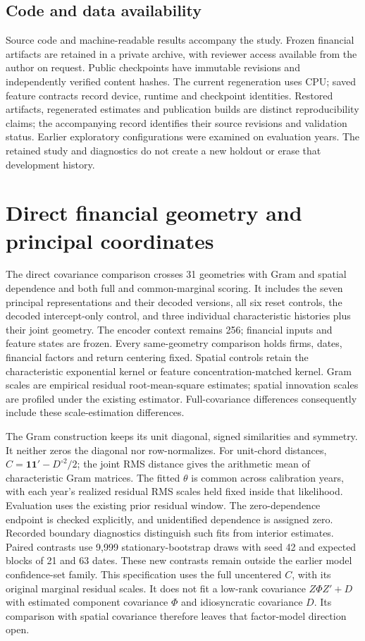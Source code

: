\documentclass[11pt]{article}
\begin{document}
\subsection{Code and data availability}
Source code and machine-readable results accompany the study. Frozen financial
artifacts are retained in a private archive, with reviewer access available
from the author on request. Public checkpoints have immutable revisions and
independently verified content hashes. The current regeneration uses
CPU\@; saved
feature contracts record device, runtime and checkpoint identities.
Restored artifacts, regenerated estimates
and publication builds are distinct reproducibility claims; the accompanying
record identifies their source revisions and validation status. Earlier
exploratory configurations were examined on evaluation years. The retained
study and diagnostics do not create a new holdout or erase that development
history.

\section{Direct financial geometry and principal
coordinates}\label{sec:geometry}
The direct covariance comparison crosses 31 geometries with Gram and spatial
dependence and both full and common-marginal scoring. It includes the seven
principal representations and their decoded versions, all six reset controls,
the decoded intercept-only control, and three individual characteristic
histories plus their joint geometry. The encoder context remains 256; financial
inputs and feature states are frozen. Every same-geometry comparison holds
firms, dates, financial factors and return centering fixed. Spatial controls
retain the characteristic exponential kernel or feature concentration-matched
kernel. Gram scales are empirical residual root-mean-square estimates; spatial
innovation scales are profiled under the existing estimator. Full-covariance
differences consequently include these scale-estimation differences.

The Gram construction keeps its unit diagonal, signed similarities and symmetry.
It neither zeros the diagonal nor row-normalizes. For unit-chord distances,
$C=\mathbf1\mathbf1'-D^{\circ2}/2$; the joint RMS distance gives the arithmetic
mean of characteristic Gram matrices. The fitted $\theta$ is common across
calibration years, with each year's realized residual RMS scales held fixed
inside that likelihood. Evaluation uses the existing prior residual window.
The zero-dependence endpoint is checked explicitly, and unidentified dependence
is assigned zero. Recorded boundary diagnostics distinguish such fits from
interior estimates. Paired contrasts use 9,999 stationary-bootstrap draws with
seed 42 and expected blocks of 21 and 63 dates. These new contrasts remain
outside the earlier model confidence-set family.
This specification uses the full uncentered $C$, with its original marginal
residual scales. It does not fit a low-rank covariance $Z\Phi Z'+D$ with
estimated component covariance $\Phi$ and idiosyncratic covariance $D$.
Its comparison with spatial covariance therefore leaves that factor-model
direction open.
\end{document}
